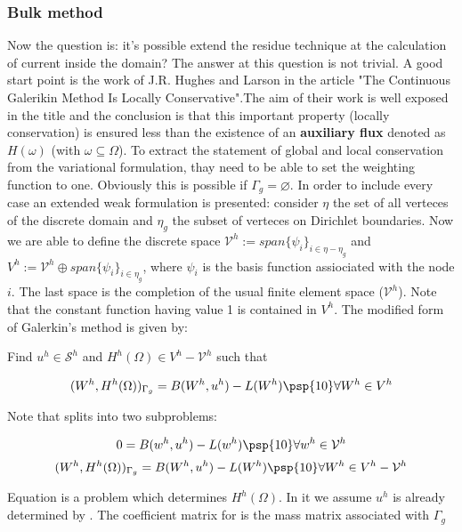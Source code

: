 \subsubsection{Bulk method}
Now the question is: it's possible extend the residue technique at the calculation of current inside the domain? The answer at this question is not trivial. A good start point is the work of J.R. Hughes and Larson in the article "The Continuous Galerikin Method Is Locally Conservative".The aim of their work is well exposed in the title and the conclusion is that this important property (locally conservation) is ensured less than the existence of an \textbf{auxiliary flux} denoted as $H(\omega)$ (with $\omega \subseteq\Omega$). 
To extract the statement of global and local conservation from the variational formulation, thay need to be able to set the weighting function to one. Obviously this is possible if $\Gamma_g=\varnothing$. In order to include every case an extended weak formulation is presented: consider $\eta$ the set of all verteces of the discrete domain and $\eta_g$ the subset of verteces on Dirichlet boundaries.
Now we are able to define the discrete space $\mathcal{V}^h:=span\{\psi_i\}_{i\in \eta - \eta_g} $ and  $V^h:=\mathcal{V}^h \oplus span\{\psi_i\}_{i\in \eta_g}$, where $\psi_i$ is the basis function assiociated with the node $i$.
The last space is the completion of the usual finite element space ($\mathcal{V}^h$). Note that the constant function having value 1 is contained in $V^h$. The modified form of Galerkin's method is given by:

Find $u^h\in \mathcal{S}^h$ and $H^h(\Omega)\in V^h - \mathcal{V}^h$ such that

\begin{equation}
\label{eq: extended weak formulation}
(W^h,H^h(\Omega))_{\Gamma_g}=B(W^h,u^h)-L(W^h) \psp{10} \forall W^h\in V^h
\end{equation}

Note that  splits into two subproblems:

\begin{equation}
\label{eq: usally problem}
0=B(w^h,u^h)-L(w^h) \psp{10} \forall w^h\in \mathcal{V}^h
\end{equation}
\begin{equation}
\label{eq: problem auxiliary flux}
(W^h,H^h(\Omega))_{\Gamma_g}=B(W^h,u^h)-L(W^h) \psp{10} \forall W^h\in V^h-\mathcal{V}^h
\end{equation}

Equation  is a problem which determines $H^h(\Omega)$. In it we assume $u^h$ is already determined by .
The coefficient matrix for  is the mass matrix associated with $\Gamma_g$

